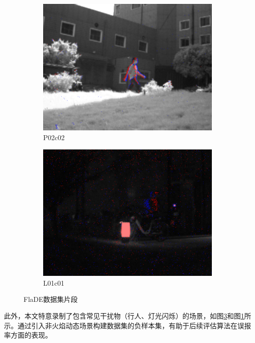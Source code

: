 \begin{figure}[ht]
\begin{subfigure}{0.32\textwidth}
        \includegraphics[width=\textwidth]{figures/FlaDE_05.png}
        \caption{P02\textunderscore c02}
        \label{subfig:FlaDE_06}
    \end{subfigure}
    \hfill
    \begin{subfigure}{0.32\textwidth}
        \centering
        \includegraphics[width=\textwidth]{figures/FlaDE_06.png}
        \caption{L01\textunderscore c01}
        \label{subfig:FlaDE_05}
    \end{subfigure}
    \caption{FlaDE数据集片段}
\end{figure}

此外，本文特意录制了包含常见干扰物（行人、灯光闪烁）的场景，如图\ref{subfig:FlaDE_05}和图\ref{subfig:FlaDE_06}所示。通过引入非火焰动态场景构建数据集的负样本集，有助于后续评估算法在误报率方面的表现。

